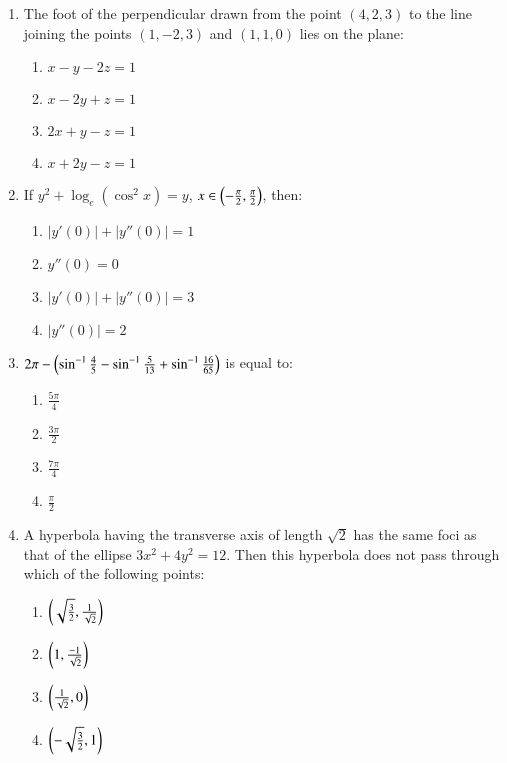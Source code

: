 \documentclass[journal,12pt,onecolumn]{IEEEtran}
\theoremstyle{remark}
\begin{document}
\begin{enumerate}
    \item The foot of the perpendicular drawn from the point $ (4, 2, 3) $ to the line joining the points $ (1, -2, 3) $ and $ (1, 1, 0) $ lies on the plane:
    \begin{enumerate}
        \item $ x - y - 2z = 1 $
        \item $ x - 2y + z = 1 $
        \item $ 2x + y - z = 1 $
        \item $ x + 2y - z = 1 $
    \end{enumerate}

    \item If $ y^2 + \log_e(\cos^2x) = y $, $ x \in \left(-\frac{\pi}{2}, \frac{\pi}{2}\right) $, then:
    \begin{enumerate}
        \item $ |y'(0)| + |y''(0)| = 1 $
        \item $ y''(0) = 0 $
        \item $ |y'(0)| + |y''(0)| = 3 $
        \item $ |y''(0)| = 2 $
    \end{enumerate}

    \item $ 2\pi-\left(\sin^{-1}\frac{4}{5} - \sin^{-1}\frac{5}{13} + \sin^{-1}\frac{16}{65}\right)$ 
    is equal to:
    \begin{enumerate}
        \item $ \frac{5\pi}{4} $
        \item $ \frac{3\pi}{2} $
        \item $ \frac{7\pi}{4} $
        \item $ \frac{\pi}{2} $
    \end{enumerate}

    \item A hyperbola having the transverse axis of length $\sqrt{2}$ has the same foci as that of the ellipse $ 3x^2 + 4y^2 = 12 $. Then this hyperbola does not pass through which of the following points:
    \begin{enumerate}
        \item $ \left( \sqrt{\frac{3}{2}}, \frac{1}{\sqrt{2}} \right) $
        \item $ \left( 1, \frac{-1}{\sqrt{2}} \right) $
        \item $ \left( \frac{1}{\sqrt{2}}, 0 \right) $
        \item $ \left( -\sqrt{\frac{3}{2}}, 1\right) $
    \end{enumerate}


\end{enumerate}
\end{document}
